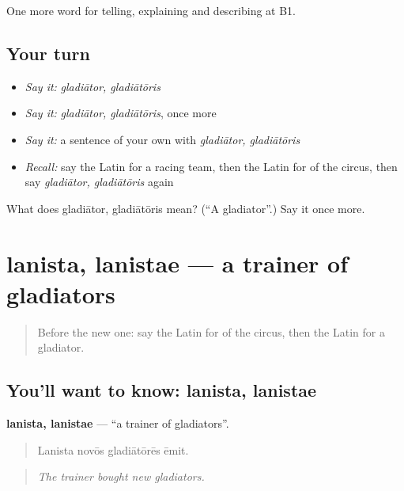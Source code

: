 \begin{grammarlens}[title={What you've built}]
One more word for telling, explaining and describing at B1.
\end{grammarlens}

\subsection*{Your turn}
\begin{itemize}
\raggedright
  \item \emph{Say it:} \emph{gladiātor, gladiātōris}
  \item \emph{Say it:} \emph{gladiātor, gladiātōris}, once more
  \item \emph{Say it:} a sentence of your own with \emph{gladiātor, gladiātōris}
  \item \emph{Recall:} say the Latin for a racing team, then the Latin for of the circus, then say \emph{gladiātor, gladiātōris} again
\end{itemize}

\begin{tcolorbox}[breakable,colback=teal!4,colframe=teal!35!black,title={Before you move on}]
What does gladiātor, gladiātōris mean? (\textquotedblleft{}A gladiator\textquotedblright{}.) Say it once more.
\end{tcolorbox}
\section[lanista, lanistae]{lanista, lanistae — a trainer of gladiators}

\label{lesson:LA-C336-lanista}



\begin{quote}
Before the new one: say the Latin for of the circus, then the Latin for a gladiator.
\end{quote}

\subsection*{You'll want to know: lanista, lanistae}
\textbf{lanista, lanistae} — \textquotedblleft{}a trainer of gladiators\textquotedblright{}.

\begin{quote}
Lanista novōs gladiātōrēs ēmit.
\end{quote}

\begin{quote}
\emph{The trainer bought new gladiators.}
\end{quote}

